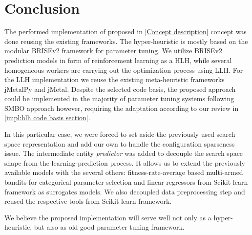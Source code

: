 \section{Conclusion}
The performed implementation of proposed in \cref{Concept description} concept was done reusing the existing frameworks. The hyper-heuristic is mostly based on the modular BRISEv2 framework for parameter tuning. We utilize BRISEv2 prediction models in form of reinforcement learning as a HLH, while several homogeneous workers are carrying out the optimization process using LLH. For the LLH implementation we reuse the existing meta-heuristic frameworks jMetalPy and jMetal. Despite the selected code basis, the proposed approach could be implemented in the majority of parameter tuning systems following SMBO approach however, requiring the adaptation according to our review in \cref{impl:hlh code basis section}.

In this particular case, we were forced to set aside the previously used search space representation and add our own to handle the configuration sparseness issue. The intermediate entity \emph{predictor} was added to decouple the search space shape from the learning-prediction process. It allows us to extend the previously available models with the several others: fitness-rate-average based multi-armed bandits for categorical parameter selection and linear regressors from Scikit-learn framework as surrogates models. We also decoupled data preprocessing step and reused the respective tools from Scikit-learn framework.

We believe the proposed implementation will serve well not only as a hyper-heuristic, but also as old good parameter tuning framework.